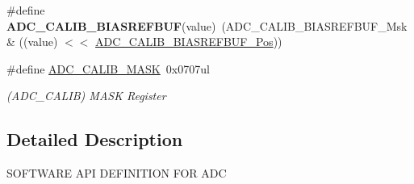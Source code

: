 \begin{DoxyCompactItemize}
\item 
\hypertarget{group___s_a_m_l21___a_d_c_gab2ab85550bf3f16459c416e34897117f}{}\#define {\bfseries A\+D\+C\+\_\+\+C\+A\+L\+I\+B\+\_\+\+B\+I\+A\+S\+R\+E\+F\+B\+U\+F}(value)~(A\+D\+C\+\_\+\+C\+A\+L\+I\+B\+\_\+\+B\+I\+A\+S\+R\+E\+F\+B\+U\+F\+\_\+\+Msk \& ((value) $<$$<$ \hyperlink{group___s_a_m_l21___a_d_c_ga29eeca0ab642341d2cd5cebb287f47d0}{A\+D\+C\+\_\+\+C\+A\+L\+I\+B\+\_\+\+B\+I\+A\+S\+R\+E\+F\+B\+U\+F\+\_\+\+Pos}))\label{group___s_a_m_l21___a_d_c_gab2ab85550bf3f16459c416e34897117f}

\item 
\hypertarget{group___s_a_m_l21___a_d_c_ga6aee42d2c5e635f59f6e3df40bb9152e}{}\#define \hyperlink{group___s_a_m_l21___a_d_c_ga6aee42d2c5e635f59f6e3df40bb9152e}{A\+D\+C\+\_\+\+C\+A\+L\+I\+B\+\_\+\+M\+A\+S\+K}~0x0707ul\label{group___s_a_m_l21___a_d_c_ga6aee42d2c5e635f59f6e3df40bb9152e}

\begin{DoxyCompactList}\small\item\em (A\+D\+C\+\_\+\+C\+A\+L\+I\+B) M\+A\+S\+K Register \end{DoxyCompactList}\end{DoxyCompactItemize}


\subsection{Detailed Description}
S\+O\+F\+T\+W\+A\+R\+E A\+P\+I D\+E\+F\+I\+N\+I\+T\+I\+O\+N F\+O\+R A\+D\+C 